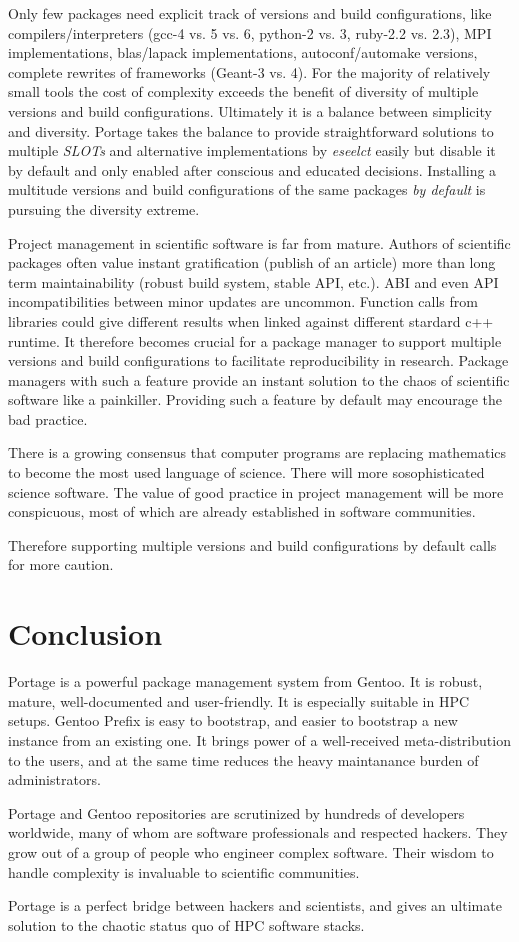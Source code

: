 \documentclass[a4paper,conference]{IEEEtran}
\begin{document}
Only few packages need explicit track of versions and build
configurations, like compilers/interpreters (gcc-4 vs. 5 vs. 6,
python-2 vs. 3, ruby-2.2 vs. 2.3), MPI implementations, blas/lapack
implementations, autoconf/automake versions, complete rewrites of
frameworks (Geant-3 vs. 4).  For the majority of relatively small
tools the cost of complexity exceeds the benefit of diversity of
multiple versions and build configurations.  Ultimately it is a
balance between simplicity and diversity.  Portage takes the balance
to provide straightforward solutions to multiple \emph{SLOTs} and
alternative implementations by \emph{eseelct} easily but disable it by
default and only enabled after conscious and educated decisions.
Installing a multitude versions and build configurations of the same
packages \emph{by default} is pursuing the diversity extreme.

Project management in scientific software is far from mature.  Authors
of scientific packages often value instant gratification (publish of
an article) more than long term maintainability (robust build system,
stable API, etc.).  ABI and even API incompatibilities between minor
updates are uncommon.  Function calls from libraries could give
different results when linked against different stardard c++ runtime.
It therefore becomes crucial for a package manager to support multiple
versions and build configurations to facilitate reproducibility in
research.  Package managers with such a feature provide an instant
solution to the chaos of scientific software like a painkiller.
Providing such a feature by default may encourage the bad practice.

There is a growing consensus that computer programs are replacing
mathematics to become the most used language of science.  There will
more sosophisticated science software.  The value of good practice in
project management will be more conspicuous, most of which are already
established in software communities.

Therefore supporting multiple versions and build configurations by
default calls for more caution.

\section{Conclusion}
\label{sec:conclusion}
Portage is a powerful package management system from Gentoo.  It is
robust, mature, well-documented and user-friendly.  It is especially
suitable in HPC setups.  Gentoo Prefix is easy to bootstrap, and
easier to bootstrap a new instance from an existing one.  It brings
power of a well-received meta-distribution to the users, and at the
same time reduces the heavy maintanance burden of administrators.

Portage and Gentoo repositories are scrutinized by hundreds of
developers worldwide, many of whom are software professionals and
respected hackers.  They grow out of a group of people who engineer
complex software.  Their wisdom to handle complexity is invaluable to
scientific communities.

Portage is a perfect bridge between hackers and scientists, and gives
an ultimate solution to the chaotic status quo of HPC software stacks.


\end{document}
